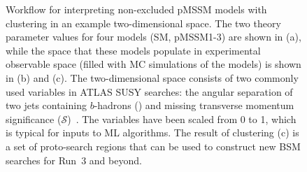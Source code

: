 \documentclass[letter, USenglish, 11pt, subfigure]{article}
\begin{document}
\begin{figure}[!htbp]
  \centering
  
  \caption{Workflow for interpreting non-excluded pMSSM models with clustering in an example two-dimensional space. The two theory parameter values for four models (SM, pMSSM1-3) are shown in (a), while the space that these models populate in experimental observable space (filled with MC simulations of the models) is shown in (b) and (c). The two-dimensional space consists of two commonly used variables in ATLAS SUSY searches: the angular separation of two jets containing $b$-hadrons (\drbb) and missing transverse momentum significance ($\mathcal{S}$)~\cite{ATLAS-CONF-2018-038}. The variables have been scaled from 0 to 1, which is typical for inputs to ML algorithms. The result of clustering (c) is a set of proto-search regions that can be used to construct new BSM searches for Run~3 and beyond.}
  \label{fig:clusteringWorkflow}
\end{figure}
\end{document}
